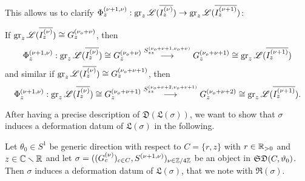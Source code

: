 This allows us to clarify $\Phi_{z}^{(\nu+1,\nu)}:\operatorname{gr}_z\mathscr{L}(\overline{I_z^{(\nu)}}) \to \operatorname{gr}_z\mathscr{L}(\overline{I_z^{(\nu+1)}})$: 

If $\operatorname{gr}_z\mathscr{L}(\overline{I_z^{(\nu)}}) \cong G_z^{(\nu_o+\nu)}$, then 
\[
\Phi_z^{(\nu+1,\nu)}: \operatorname{gr}_z\mathscr{L}(\overline{I_z^{(\nu)}}) \cong G_z^{(\nu_o+\nu)} \overset{S_{zz}^{(\nu_o+\nu+1,\nu_o+\nu)}}{\longrightarrow} G_z^{(\nu_o+\nu+1)} \cong  \operatorname{gr}_z\mathscr{L}(\overline{I_z^{(\nu+1)}})
\]
and similar if $\operatorname{gr}_z\mathscr{L}(\overline{I_z^{(\nu)}}) \cong G_z^{(\nu_o+\nu+1)}$, then 
\[
\Phi_z^{(\nu+1,\nu)}: \operatorname{gr}_z\mathscr{L}(\overline{I_z^{(\nu)}}) \cong G_z^{(\nu_o+\nu+1)} \overset{S_{zz}^{(\nu_o+\nu+2,\nu_o+\nu+1)}}{\longrightarrow} G_z^{(\nu_o+\nu+2)} \cong  \operatorname{gr}_z\mathscr{L}(\overline{I_z^{(\nu+1)}}).
\]

After having a precise description of $\mathfrak{D}(\mathfrak{L}(\sigma))$, we want to show that $\sigma$ induces a deformation datum of $\mathfrak{L}(\sigma)$ in the following.

\begin{lem}
    Let $\theta_0 \in S^1$ be generic direction with respect to $C=\{r,z\}$ with $r \in \mathbb{R}_{>0}$ and $z \in \mathbb{C} \smallsetminus \mathbb{R}$ and let $\sigma =((G_c^{(\nu)})_{c \in C}, S^{(\nu+1,\nu)})_{\nu \in \mathbb{Z}/4\mathbb{Z}}$ be an object in $\mathfrak{SD}(C,\vartheta_0)$. Then $\sigma$ induces a deformation datum of $\mathfrak{L}(\sigma)$, that we note with $\mathfrak{R}(\sigma)$.
\end{lem}

